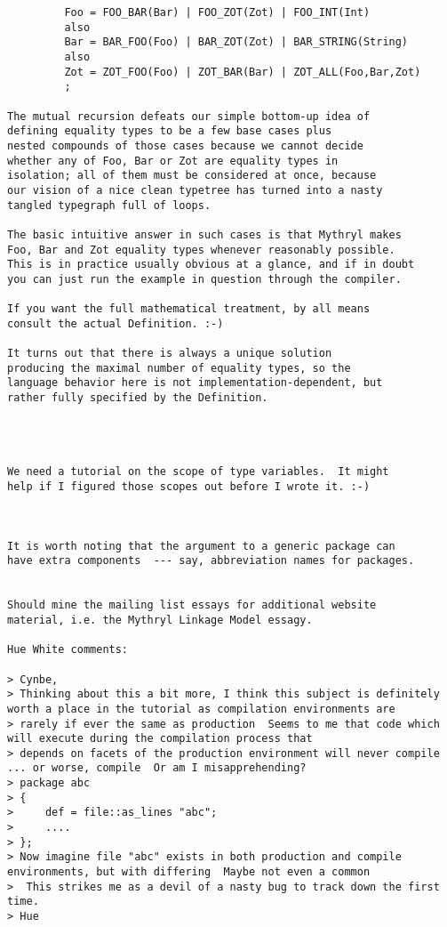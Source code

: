 \begin{verbatim}
         Foo = FOO_BAR(Bar) | FOO_ZOT(Zot) | FOO_INT(Int) 
         also 
         Bar = BAR_FOO(Foo) | BAR_ZOT(Zot) | BAR_STRING(String) 
         also 
         Zot = ZOT_FOO(Foo) | ZOT_BAR(Bar) | ZOT_ALL(Foo,Bar,Zot) 
         ; 

The mutual recursion defeats our simple bottom-up idea of 
defining equality types to be a few base cases plus 
nested compounds of those cases because we cannot decide 
whether any of Foo, Bar or Zot are equality types in 
isolation; all of them must be considered at once, because 
our vision of a nice clean typetree has turned into a nasty 
tangled typegraph full of loops. 

The basic intuitive answer in such cases is that Mythryl makes 
Foo, Bar and Zot equality types whenever reasonably possible. 
This is in practice usually obvious at a glance, and if in doubt 
you can just run the example in question through the compiler. 

If you want the full mathematical treatment, by all means 
consult the actual Definition. :-) 

It turns out that there is always a unique solution 
producing the maximal number of equality types, so the 
language behavior here is not implementation-dependent, but 
rather fully specified by the Definition. 




We need a tutorial on the scope of type variables.  It might 
help if I figured those scopes out before I wrote it. :-) 



It is worth noting that the argument to a generic package can 
have extra components  --- say, abbreviation names for packages. 


Should mine the mailing list essays for additional website 
material, i.e. the Mythryl Linkage Model essagy. 

Hue White comments: 

> Cynbe, 
> Thinking about this a bit more, I think this subject is definitely worth a place in the tutorial as compilation environments are 
> rarely if ever the same as production  Seems to me that code which will execute during the compilation process that 
> depends on facets of the production environment will never compile ... or worse, compile  Or am I misapprehending? 
> package abc 
> { 
>     def = file::as_lines "abc"; 
>     .... 
> }; 
> Now imagine file "abc" exists in both production and compile environments, but with differing  Maybe not even a common 
>  This strikes me as a devil of a nasty bug to track down the first time. 
> Hue 




\end{verbatim}
